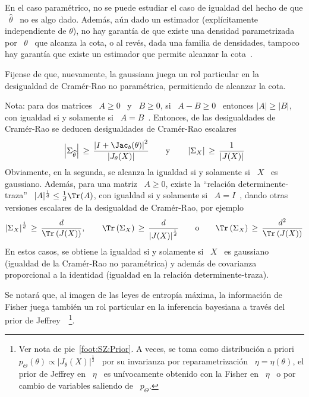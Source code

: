 %
\noindent En el caso param\'etrico, no se puede estudiar el caso de igualdad del
hecho de  que \ $\widehat{\theta}$ \ no  es algo dado.  Adem\'as,  a\'un dado un
estimador (expl\'icitamente independiente de $\theta$), no hay garant\'ia de que
existe una  densidad parametrizada por  \ $\theta$ \  que alcanza la cota,  o al
rev\'es, dada  una familia de densidades,  tampoco hay garant\'ia  que existe un
estimador que permite alcanzar la cota~\cite{CovTho06, Kay93}.

Fijense  de  que,  nuevamente,  la  gaussiana  juega un  rol  particular  en  la
desigualdad de Cram\'er-Rao no param\'etrica, permitiendo de alcanzar la cota.

Nota: para  dos matrices \  $A \ge 0$  \ y \  $B \ge 0$,  si \ $A  - B \ge  0$ \
entonces $|A| \ge  |B|$, con igualdad si y solamente si  \ $A = B$~\cite[cap.~1,
teorema~25]{MagNeu99}.   Entonces,  de  las  desigualdades  de  Cram\'er-Rao  se
deducen desigualdades de Cram\'er-Rao escalares
%
\[
\left|   \Sigma_{\widehat{\theta}}  \right|   \,   \ge  \,   \frac{\left|  I   +
    \Jac_b(\theta) \right|^2}{\left| J_\theta(X) \right|} \qquad \mbox{y} \qquad
\left| \Sigma_X \right| \, \ge \, \frac{1}{\left| J(X) \right|}
\]
%
Obviamente, en la segunda,  se alcanza la igualdad si y solamente  si \ $X$ \ es
gaussiano.   Adem\'as, para  una  matriz \  $A  \ge 0$,  existe la  ``relaci\'on
determinente-traza''  \ $|A|^{\frac1d} \le  \frac1d \Tr(A)$,  con igualdad  si y
solamente si  \ $A = I$~\cite[cap.~11, sec.~4]{MagNeu99},  dando otras versiones
escalares de la desigualdad de Cram\'er-Rao, por ejemplo
%
\[
\left| \Sigma_X  \right|^{\frac1d} \,  \ge \, \frac{d}{\Tr\left(  J(X) \right)},
\qquad   \Tr\left(   \Sigma_X   \right)   \,   \ge   \,   \frac{d}{\left|   J(X)
  \right|^{\frac1d}} \qquad \mbox{o} \qquad \Tr\left( \Sigma_X \right) \, \ge \,
\frac{d^2}{\Tr\left( J(X) \right)}
\]
%
En estos casos,  se obtiene la igualdad si  y solamente si \ $X$  \ es gaussiano
(igualdad  de  la  Cram\'er-Rao  no  param\'etrica)  y  adem\'as  de  covarianza
proporcional a la identidad (igualdad en la relaci\'on determinente-traza).

Se notar\'a que, al imagen de las leyes de entrop\'ia m\'axima, la informaci\'on
de  Fisher  juega tambi\'en  un  rol particular  en  la  inferencia bayesiana  a
trav\'es del prior de Jeffrey~\cite{Jef46, Jef48, LehCas98, Rob07}~\footnote{Ver
  nota  de pie~\ref{foot:SZ:Prior}.   A  veces, se  toma  como distribuci\'on  a
  priori \ $p_\Theta(\theta) \propto  |J_\theta(X)|^\frac12$ \ por su invarianza
  por reparametrizaci\'on \ $\eta = \eta(\theta)$,  \ie el prior de Jeffrey en \
  $\eta$ \ es un\'ivocamente  obtenido con la Fisher en \ $\eta$  \ o por cambio
  de variables saliendo de \ $p_\Theta$.}.

